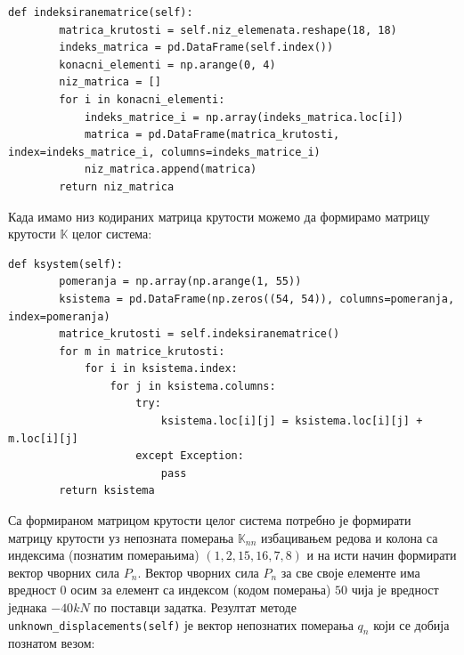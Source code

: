 \documentclass[11pt, a4paper]{article}
\begin{document}
\begin{lstlisting}
def indeksiranematrice(self):
        matrica_krutosti = self.niz_elemenata.reshape(18, 18)
        indeks_matrica = pd.DataFrame(self.index())  
        konacni_elementi = np.arange(0, 4)  
        niz_matrica = []
        for i in konacni_elementi:
            indeks_matrice_i = np.array(indeks_matrica.loc[i])
            matrica = pd.DataFrame(matrica_krutosti, index=indeks_matrice_i, columns=indeks_matrice_i)
            niz_matrica.append(matrica)
        return niz_matrica
\end{lstlisting}
Када имамо низ кодираних матрица крутости можемо да формирамо матрицу крутости $\mathbb{K}$ целог система:
\begin{lstlisting}
def ksystem(self):
        pomeranja = np.array(np.arange(1, 55))  
        ksistema = pd.DataFrame(np.zeros((54, 54)), columns=pomeranja, index=pomeranja) 
        matrice_krutosti = self.indeksiranematrice()
        for m in matrice_krutosti:
            for i in ksistema.index:
                for j in ksistema.columns:
                    try:
                        ksistema.loc[i][j] = ksistema.loc[i][j] + m.loc[i][j]
                    except Exception:
                        pass
        return ksistema
\end{lstlisting}

Са формираном матрицом крутости целог система потребно је формирати матрицу крутости уз непозната померања  $\mathbb{K}_{nn}$  избацивањем редова и колона са индексима (познатим померањима) $(1, 2, 15, 16, 7, 8)$  и на исти начин формирати вектор чворних сила $P_{n}$. Вектор чворних сила $P_{n}$ за све своје елементе има вредност $0$ осим за елемент са индексом (кодом померања) $50$ чија је вредност једнака $-40kN$ по поставци задатка. Резултат методе \texttt{unknown\_displacements(self)} је вектор непознатих померања $q_{n}$ који се добија познатом везом:
\end{document}

